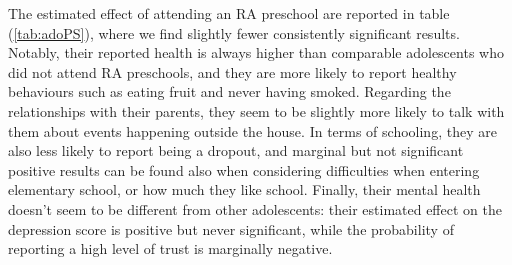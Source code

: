 \documentclass[12pt]{article}
\begin{document}
The estimated effect of attending an RA preschool are reported in table (\ref{tab:adoPS}), where we find slightly fewer consistently significant results. Notably, their reported health is always higher than comparable adolescents who did not attend RA preschools, and they are more likely to report healthy behaviours such as eating fruit and never having smoked. 
Regarding the relationships with their parents, they seem to be slightly more likely to talk with them about events happening outside the house. 
In terms of schooling, they are also less likely to report being a dropout, and marginal but not significant positive results can be found also when considering difficulties when entering elementary school, or how much they like school. 
Finally, their mental health doesn't seem to be different from other adolescents: their estimated effect on the depression score is positive but never significant, while the probability of reporting a high level of trust is marginally negative.
\end{document}
